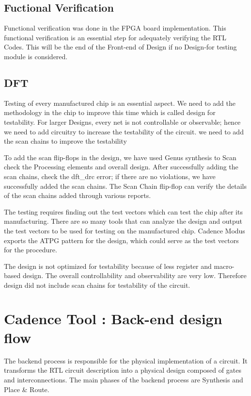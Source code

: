 \subsection{Fuctional Verification}
Functional verification was done in the FPGA board implementation. This functional verification is an essential step for adequately verifying the RTL Codes. This will be the end of the Front-end of Design if no Design-for testing module is considered.

\subsection{DFT}

Testing of every manufactured chip is an essential aspect. We need to add the methodology in the chip to improve this time which is called design for testability. For larger Designs, every net is not controllable or observable; hence we need to add circuitry to increase the testability of the circuit. we need to add the scan chains to improve the testability

To add the scan flip-flops in the design, we have used Genus synthesis to Scan check the Processing elements and overall design. After successfully adding the scan chains, check the dft\_drc error; if there are no violations, we have successfully added the scan chains. The Scan Chain flip-flop can verify the details of the scan chains added through various reports.

The testing requires finding out the test vectors which can test the chip after its manufacturing. There are so many tools that can analyze the design and output the test vectors to be used for testing on the manufactured chip. Cadence Modus exports the ATPG pattern for the design, which could serve as the test vectors for the procedure.

The design is not optimized for testability because of less register and macro-based design. The overall controllability and observability are very low. Therefore design did not include scan chains for testability of the circuit.

\section{Cadence Tool : Back-end design flow}

The backend process is responsible for the physical implementation of a circuit. It transforms the RTL circuit description into a physical design composed of gates and interconnections. The main phases of the backend process are Synthesis and Place \& Route.

